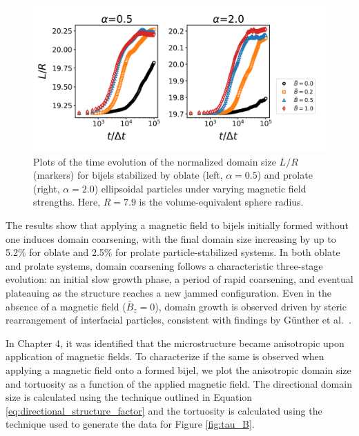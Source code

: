 \begin{figure} 
    \centering 
    \includegraphics[scale=0.6]{../figures/results/paper2/domain_size-field_on.png} 
    \caption{Plots of the time evolution of the normalized domain size \(L/R\) (markers) for bijels stabilized by oblate (left, \(\alpha = 0.5\)) 
             and prolate (right, \(\alpha = 2.0\)) ellipsoidal particles under varying magnetic field strengths. Here, \(R = 7.9\) is the volume-equivalent sphere radius.} 
    \label{fig:domain_size-field_on} 
\end{figure}

The results show that applying a magnetic field to bijels 
initially formed without one induces domain coarsening, with the final domain size increasing by up to 5.2\% for oblate and 2.5\% for 
prolate particle-stabilized systems.
In both oblate and prolate systems, domain coarsening follows a characteristic three-stage evolution: an initial slow growth phase, a period of rapid 
coarsening, and eventual plateauing as the structure reaches a new jammed configuration. Even in the absence of a magnetic field (\(\bar{B}_z = 0\)), 
domain growth is observed driven by steric rearrangement of interfacial particles, consistent 
with findings by Günther et al.~\cite{gunther_timescales_2014}. 

In Chapter 4, it was identified that the microstructure became anisotropic upon application of magnetic fields. To characterize if the same is observed
when applying a magnetic field onto a formed bijel, we plot the anisotropic domain size and tortuosity as a function of the applied magnetic field. The
directional domain size is calculated using the technique outlined in Equation \ref{eq:directional_structure_factor} and the tortuosity is calculated
using the technique used to generate the data for Figure \ref{fig:tau_B}.

